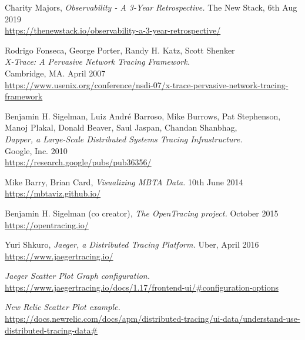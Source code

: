 \documentclass[pdftex,titlepage]{article}
\begin{document}
    \begin{thebibliography}{20}
        Charity Majors, \textit{Observability - A 3-Year Retrospective.} 
        The New Stack, 6th Aug 2019 \\
        \url{https://thenewstack.io/observability-a-3-year-retrospective/}
        
        Rodrigo Fonseca, George Porter, Randy H. Katz, Scott Shenker \\
        \textit{X-Trace: A Pervasive Network Tracing Framework.} \\
        Cambridge, MA. April 2007 \\
        \url{https://www.usenix.org/conference/nsdi-07/x-trace-pervasive-network-tracing-framework}

        Benjamin H. Sigelman, Luiz André Barroso, Mike Burrows, Pat Stephenson, Manoj Plakal, Donald Beaver, Saul Jaspan, Chandan Shanbhag, \\
        \textit{Dapper, a Large-Scale Distributed Systems Tracing Infrastructure.} \\
        Google, Inc. 2010 \\
        \url{https://research.google/pubs/pub36356/}

        Mike Barry, Brian Card, \textit{Visualizing MBTA Data.}
        10th June 2014 \\
        \url{https://mbtaviz.github.io/}

        Benjamin H. Sigelman (co creator), \textit{The OpenTracing project.}
        October 2015 \\
        \url{https://opentracing.io/}

        Yuri Shkuro, \textit{Jaeger, a Distributed Tracing Platform.}
        Uber, April 2016 \\
        \url{https://www.jaegertracing.io/}

        \textit{Jaeger Scatter Plot Graph configuration.} \\
        \url{https://www.jaegertracing.io/docs/1.17/frontend-ui/#configuration-options}

        \textit{New Relic Scatter Plot example.} \\
        \url{https://docs.newrelic.com/docs/apm/distributed-tracing/ui-data/understand-use-distributed-tracing-data#}


\end{thebibliography}
\end{document}
